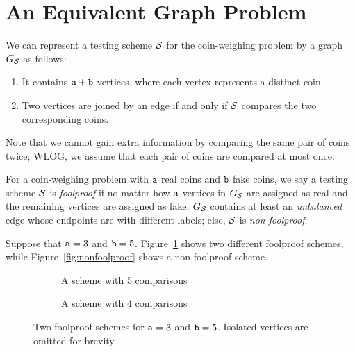 

\newcommand\comment[1]{}

\section{An Equivalent Graph Problem}

We can represent a testing scheme ${\cal S}$ for the coin-weighing problem by a graph $G_{\cal S}$ as follows: 
\begin{enumerate}
\setlength{\itemsep}{0pt}
\item It contains $\mathtt{a} + \mathtt{b}$ vertices, where each vertex represents a distinct coin.
\item Two vertices are joined by an edge if and only if ${\cal S}$ compares the two corresponding coins.  
\end{enumerate}
Note that we cannot gain extra information by comparing the same pair of coins twice;  WLOG, we assume that each pair of coins are compared at most once.

\begin{definition}
For a coin-weighing problem with $\mathtt{a}$ real coins and $\mathtt{b}$ fake coins, 
we say a testing scheme ${\cal S}$ is \emph{foolproof} if no matter how $\mathtt{a}$ vertices in $G_{\cal S}$ 
are assigned as real and the remaining vertices are assigned as fake, $G_{\cal S}$ contains at least 
an \emph{unbalanced} edge whose endpoints are with different labels;  else, ${\cal S}$ is \emph{non-foolproof}.
\end{definition}

Suppose that $\mathtt{a} = 3$ and $\mathtt{b} = 5$.  Figure~\ref{fig:foolproof} shows two different foolproof schemes, while Figure~\ref{fig:nonfoolproof} shows a non-foolproof scheme.

\begin{figure}[!htb]
  \centering
  \begin{subfigure}[b]{0.45\textwidth}
    \centering  \vspace*{2.5ex}
    \caption{A scheme with 5 comparisons}
  \end{subfigure}
  \begin{subfigure}[b]{0.45\textwidth}
    \centering 
    \caption{A scheme with 4 comparisons}
  \end{subfigure}
  \caption{Two foolproof schemes for $\mathtt{a} = 3$ and $\mathtt{b} = 5$.  Isolated vertices are omitted for brevity.} \label{fig:foolproof}
\end{figure}


